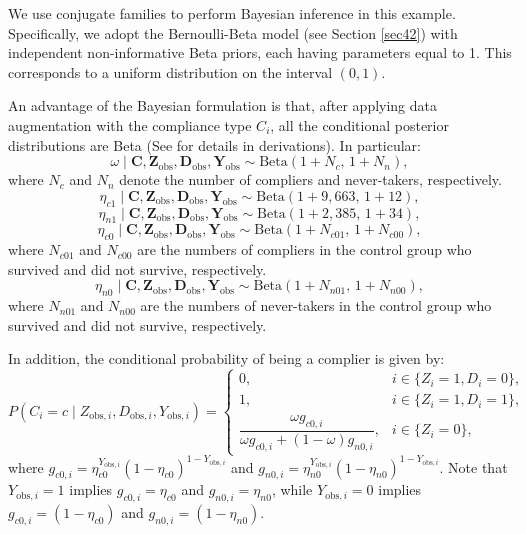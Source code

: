 We use conjugate families to perform Bayesian inference in this example. Specifically, we adopt the Bernoulli-Beta model (see Section \ref{sec42}) with independent non-informative Beta priors, each having parameters equal to 1. This corresponds to a uniform distribution on the interval $(0,1)$.  

An advantage of the Bayesian formulation is that, after applying data augmentation with the compliance type $C_i$, all the conditional posterior distributions are Beta (See \cite{imbens1997bayesian} for details in derivations). In particular:
\[
\omega \mid \mathbf{C}, \mathbf{Z}_{\text{obs}}, \mathbf{D}_{\text{obs}}, \mathbf{Y}_{\text{obs}} \sim \text{Beta}(1 + N_c,\, 1 + N_n),
\]
where $N_c$ and $N_n$ denote the number of compliers and never-takers, respectively.
\[
\eta_{c1} \mid \mathbf{C}, \mathbf{Z}_{\text{obs}}, \mathbf{D}_{\text{obs}}, \mathbf{Y}_{\text{obs}} \sim \text{Beta}(1 + 9{,}663,\, 1 + 12),
\]
\[
\eta_{n1} \mid \mathbf{C}, \mathbf{Z}_{\text{obs}}, \mathbf{D}_{\text{obs}}, \mathbf{Y}_{\text{obs}} \sim \text{Beta}(1 + 2{,}385,\, 1 + 34),
\]
\[
\eta_{c0} \mid \mathbf{C}, \mathbf{Z}_{\text{obs}}, \mathbf{D}_{\text{obs}}, \mathbf{Y}_{\text{obs}} \sim \text{Beta}(1 + N_{c01},\, 1 + N_{c00}),
\]
where $N_{c01}$ and $N_{c00}$ are the numbers of compliers in the control group who survived and did not survive, respectively.
\[
\eta_{n0} \mid \mathbf{C}, \mathbf{Z}_{\text{obs}}, \mathbf{D}_{\text{obs}}, \mathbf{Y}_{\text{obs}} \sim \text{Beta}(1 + N_{n01},\, 1 + N_{n00}),
\]
where $N_{n01}$ and $N_{n00}$ are the numbers of never-takers in the control group who survived and did not survive, respectively.

In addition, the conditional probability of being a complier is given by:
\[
P(C_i = c \mid Z_{\text{obs},i}, D_{\text{obs},i}, Y_{\text{obs},i}) =
\begin{cases}
	0, & i \in \{Z_i = 1, D_i = 0\},\\
	1, & i \in \{Z_i = 1, D_i = 1\},\\
	\dfrac{\omega g_{c0,i}}{\omega g_{c0,i} + (1-\omega) g_{n0,i}}, & i \in \{Z_i = 0\},
\end{cases}
\]
where $g_{c0,i} = \eta_{c0}^{Y_{\text{obs},i}} (1 - \eta_{c0})^{1 - Y_{\text{obs},i}}$ and $g_{n0,i} = \eta_{n0}^{Y_{\text{obs},i}} (1 - \eta_{n0})^{1 - Y_{\text{obs},i}}$. Note that $Y_{\text{obs},i} = 1$ implies $g_{c0,i} = \eta_{c0}$ and $g_{n0,i} = \eta_{n0}$, while $Y_{\text{obs},i} = 0$ implies $g_{c0,i} = (1 - \eta_{c0})$ and $g_{n0,i} = (1 - \eta_{n0})$.

